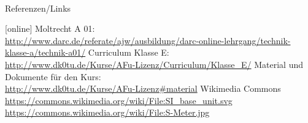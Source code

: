 \renewcommand{\refname}{Referenzen}

\hypertarget{refs}{}
\textcolor{white}{} \\ %
\Large Referenzen/Links
\footnotesize

\begin{thebibliography}{}
    [online]
     Moltrecht A 01: \\
                    \url{http://www.darc.de/referate/ajw/ausbildung/darc-online-lehrgang/technik-klasse-a/technik-a01/}
      Curriculum Klasse E: \\
                    \url{http://www.dk0tu.de/Kurse/AFu-Lizenz/Curriculum/Klasse_E/}
       Material und Dokumente für den Kurs: \\
                    \url{http://www.dk0tu.de/Kurse/AFu-Lizenz#material}
        Wikimedia Commons \\
                    \url{https://commons.wikimedia.org/wiki/File:SI_base_unit.svg}\\
                    \url{https://commons.wikimedia.org/wiki/File:S-Meter.jpg}
\end{thebibliography} 


